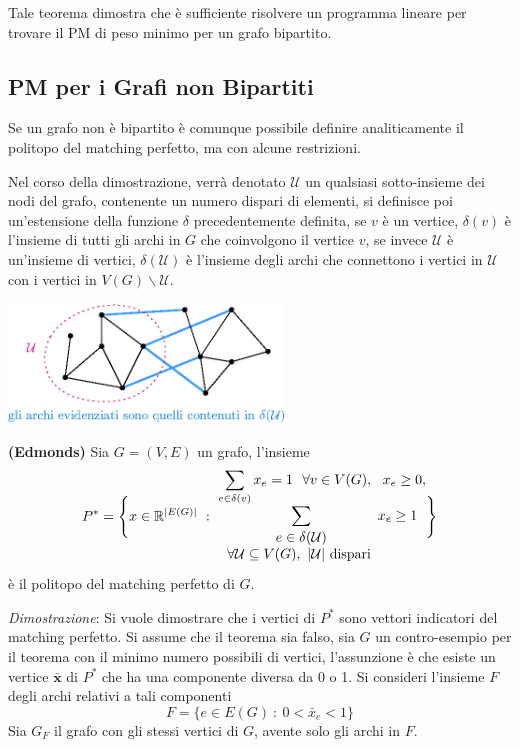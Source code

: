 \documentclass[10pt, letterpaper]{report}
\newcommand{\x}{{\mathbf{x}}}
\begin{document}
\noindent
Tale teorema dimostra che è sufficiente risolvere un programma lineare per trovare il PM di peso minimo per un grafo bipartito.
\subsection{PM per i Grafi non Bipartiti}
Se un grafo non è bipartito è comunque possibile definire analiticamente il politopo del matching perfetto, ma con alcune restrizioni.\bigskip 

Nel corso della dimostrazione, verrà denotato $\mathcal U$ un qualsiasi sotto-insieme dei nodi del grafo, contenente un numero dispari di elementi, si definisce poi un'estensione della funzione $\delta$ precedentemente definita, se $v$ è un vertice, $\delta(v)$ è l'insieme di tutti gli archi in $G$ che coinvolgono il vertice $v$, se invece $\mathcal U$ è un'insieme di vertici, $\delta(\mathcal U)$ è l'insieme degli archi che connettono i vertici in $\mathcal U$ con i vertici in $V(G)\backslash\mathcal U$. 
\begin{center}
    \includegraphics[width=0.55\textwidth ]{images/deltaU.eps}
\end{center}
\begin{teorema}
    \textbf{(Edmonds)} Sia $G=(V,E)$ un grafo, l'insieme 
    \begin{equation}
        P^*=\Bigg\{x\in\R^{|E(G)|} \ : \ \begin{matrix}\displaystyle
        \sum_{e\in \delta(v)}x_e=1 \ \ \forall v\in V(G), \ \ x_e\ge 0,\\ \displaystyle
        \sum_{\begin{matrix}
        e\in\delta(\mathcal U) \\ \forall \mathcal U\subseteq V(G), \ |\mathcal U| \text{ dispari }
        \end{matrix}}x_e\ge 1
        \end{matrix} \Bigg\}
    \end{equation}
    è il politopo del matching perfetto di $G$.
\end{teorema}
\textit{Dimostrazione}: Si vuole dimostrare che i vertici di $P^*$ sono vettori indicatori del matching perfetto. Si assume che il teorema sia falso, sia $G$ un contro-esempio per il teorema con il minimo numero possibili di vertici, l'assunzione è che esiste un vertice $\bar\x$ di $P^*$ che ha una componente diversa da 0 o 1. Si consideri l'insieme $F$ degli archi relativi a tali componenti 
$$ F=\{e\in E(G) \ : \ 0<\bar x_e <1\}$$
Sia $G_F$ il grafo con gli stessi vertici di $G$, avente solo gli archi in $F$.\bigskip 
\end{document}
